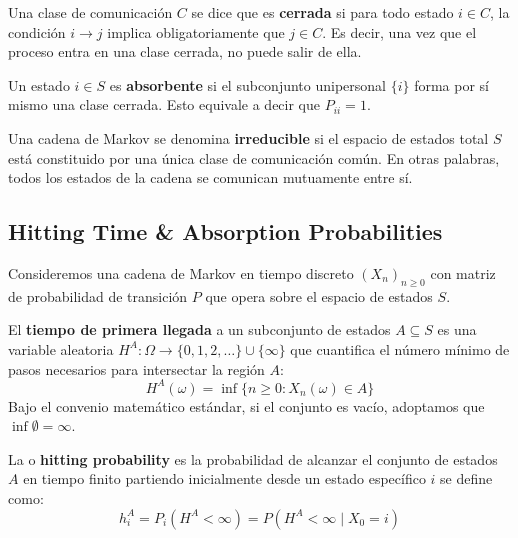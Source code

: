 \begin{definicion}
    Una clase de comunicación $C$ se dice que es \textbf{cerrada} si para todo estado $i \in C$, la condición $i \to j$ implica obligatoriamente que $j \in C$. Es decir, una vez que el proceso entra en una clase cerrada, no puede salir de ella.
\end{definicion}

\begin{definicion}
    Un estado $i \in S$ es \textbf{absorbente} si el subconjunto unipersonal $\{i\}$ forma por sí mismo una clase cerrada. Esto equivale a decir que $P_{ii} = 1$.
\end{definicion}

\begin{definicion}[Irreducibilidad]
    Una cadena de Markov se denomina \textbf{irreducible} si el espacio de estados total $S$ está constituido por una única clase de comunicación común. En otras palabras, todos los estados de la cadena se comunican mutuamente entre sí.
\end{definicion}

\subsection{Hitting Time \& Absorption Probabilities}
\noindent
Consideremos una cadena de Markov en tiempo discreto $(X_n)_{n \geq 0}$ con matriz de probabilidad de transición $P$ que opera sobre el espacio de estados $S$.

\begin{definicion}
    El \textbf{tiempo de primera llegada} a un subconjunto de estados $A \subseteq S$ es una variable aleatoria $H^A: \Omega \to \{0, 1, 2, \dots\} \cup \{\infty\}$ que cuantifica el número mínimo de pasos necesarios para intersectar la región $A$:
    \[ 
    H^A(\omega) = \inf\{n \geq 0 : X_n(\omega) \in A\} 
    \]
    Bajo el convenio matemático estándar, si el conjunto es vacío, adoptamos que $\inf \emptyset = \infty$.
\end{definicion}

\begin{definicion}
    La  o \textbf{hitting probability} es la probabilidad de alcanzar el conjunto de estados $A$ en tiempo finito partiendo inicialmente desde un estado específico $i$ se define como:
    \[ 
    h_i^A = P_i(H^A < \infty) = P(H^A < \infty \mid X_0 = i) 
    \]
\end{definicion}

